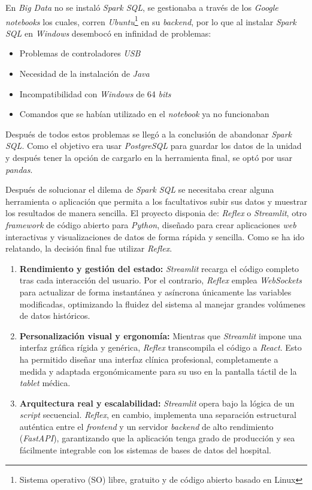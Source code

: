 En \textit{Big Data} no se instaló \textit{Spark SQL}, se gestionaba a través de los \textit{Google notebooks} los cuales, corren \textit{Ubuntu}\footnote{Sistema operativo (SO) libre, gratuito y de código abierto basado en Linux} en su \textit{backend}, por lo que al instalar \textit{Spark SQL} en \textit{Windows} desembocó en infinidad de problemas:
\begin{itemize}
    \item Problemas de controladores \textit{USB} 
    \item Necesidad de la instalación de \textit{Java}
    \item Incompatibilidad con \textit{Windows} de 64 \textit{bits}
    \item Comandos que se habían utilizado en el \textit{notebook} ya no funcionaban
\end{itemize}
Después de todos estos problemas se llegó a la conclusión de abandonar \textit{Spark SQL}. Como el objetivo era usar \textit{PostgreSQL} para guardar los datos de la unidad y después tener la opción de cargarlo en la herramienta final, se optó por usar \textit{pandas}.

Después de solucionar el dilema de \textit{Spark SQL} se necesitaba crear alguna herramienta o aplicación que permita a los facultativos subir sus datos y muestrar los resultados de manera sencilla. El proyecto disponia de: \textit{Reflex} o \textit{Streamlit}, otro \textit{framework} de código abierto para \textit{Python}, diseñado para crear aplicaciones \textit{web} interactivas y visualizaciones de datos de forma rápida y sencilla. Como se ha ido relatando, la decisión final fue utilizar \textit{Reflex}. 
\begin{enumerate}
    \item \textbf{Rendimiento y gestión del estado:} \textit{Streamlit} recarga el código completo tras cada interacción del usuario. Por el contrario, \textit{Reflex} emplea \textit{WebSockets} para actualizar de forma instantánea y asíncrona únicamente las variables modificadas, optimizando la fluidez del sistema al manejar grandes volúmenes de datos históricos.
    \item \textbf{Personalización visual y ergonomía:} Mientras que \textit{Streamlit} impone una interfaz gráfica rígida y genérica, \textit{Reflex} transcompila el código a \textit{React}. Esto ha permitido diseñar una interfaz clínica profesional, completamente a medida y adaptada ergonómicamente para su uso en la pantalla táctil de la \textit{tablet} médica.
    \item \textbf{Arquitectura real y escalabilidad:} \textit{Streamlit} opera bajo la lógica de un \textit{script} secuencial. \textit{Reflex}, en cambio, implementa una separación estructural auténtica entre el \textit{frontend} y un servidor \textit{backend} de alto rendimiento (\textit{FastAPI}), garantizando que la aplicación tenga grado de producción y sea fácilmente integrable con los sistemas de bases de datos del hospital.
\end{enumerate}

